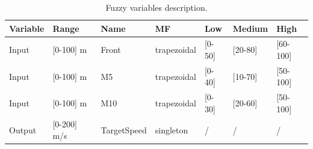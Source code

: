 \documentclass[sigconf]{acmart}
\begin{document}
\begin{table}
	\centering
	{\scriptsize
		\caption{Fuzzy variables description.}
		\label{tab:flouevar}
		\begin{tabular}{ |p{1.5cm}|p{2cm}|p{2cm}|p{2 cm}|p{1 cm}|p{1.5 cm}|p{1.5 cm}|}
			\hline
			{ \textbf{Variable}}&
			{ \textbf{Range}}&
			{ \textbf{Name}}&  
			{ \textbf{MF}} &
			{ \textbf{Low}} &
			{ \textbf{Medium}}&
			{ \textbf{High}} \\
			\hline
			Input & [0-100] m & Front & trapezoidal & [0-50] & [20-80] & [60-100]
			\\
			\hline
			Input & [0-100] m & M5 & trapezoidal &[0-40] & [10-70] & [50-100] 
			\\
			\hline
			Input & [0-100] m  & M10 & trapezoidal & [0-30] & [20-60] & [50-100]
			\\
			\hline 
			Output & [0-200] m/s & TargetSpeed & singleton & / & / & /
			\\
			\hline 
		\end{tabular} 
	}
\end{table}




\end{document}

